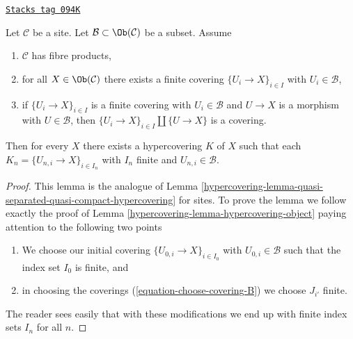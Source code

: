 \begin{lemma}[W contractible]
\label{hypercovering-lemma-w-contractible}
\href{https://stacks.math.columbia.edu/tag/094K}{\texttt{Stacks tag 094K}}

Let $\mathcal{C}$ be a site. Let $\mathcal{B} \subset \Ob(\mathcal{C})$
be a subset. Assume
\begin{enumerate}
\item $\mathcal{C}$ has fibre products,
\item for all $X \in \Ob(\mathcal{C})$ there exists a finite covering
$\{U_i \to X\}_{i \in I}$ with $U_i \in \mathcal{B}$,
\item if $\{U_i \to X\}_{i \in I}$ is a finite covering with
$U_i \in \mathcal{B}$ and $U \to X$ is a morphism with $U \in \mathcal{B}$,
then $\{U_i \to X\}_{i \in I} \amalg \{U \to X\}$ is a covering.
\end{enumerate}
Then for every $X$ there exists a hypercovering $K$ of $X$
such that each $K_n = \{U_{n, i} \to X\}_{i \in I_n}$ with
$I_n$ finite and $U_{n, i} \in \mathcal{B}$.
\end{lemma}

\begin{proof}

This lemma is the analogue of
Lemma \ref{hypercovering-lemma-quasi-separated-quasi-compact-hypercovering}
for sites. To prove the lemma we follow exactly the proof of
Lemma \ref{hypercovering-lemma-hypercovering-object}
paying attention to the following two points
\begin{enumerate}
\item[(a)] We choose our initial covering $\{U_{0, i} \to X\}_{i \in I_0}$
with $U_{0, i} \in \mathcal{B}$ such that the index set $I_0$ is finite, and
\item[(b)] in choosing the coverings
(\ref{equation-choose-covering-B})
we choose $J_{i'}$ finite.
\end{enumerate}
The reader sees easily that with these modifications we end up
with finite index sets $I_n$ for all $n$.
\end{proof}

